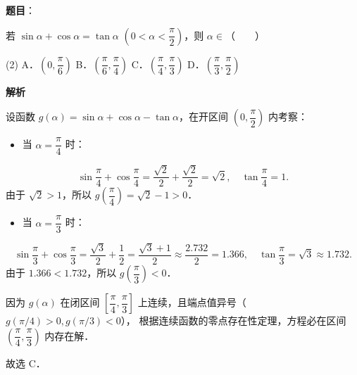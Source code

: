 \begin{answer}

\textbf{题目}：

若 $\sin\alpha + \cos\alpha = \tan\alpha$ $\left(0 < \alpha < \dfrac{\pi}{2}\right)$，则 $\alpha \in$\mbox{（　　）}

\begin{gkopts}(2)
\task A．$\left(0, \dfrac{\pi}{6}\right)$
\task B．$\left(\dfrac{\pi}{6}, \dfrac{\pi}{4}\right)$
\task C．$\left(\dfrac{\pi}{4}, \dfrac{\pi}{3}\right)$
\task D．$\left(\dfrac{\pi}{3}, \dfrac{\pi}{2}\right)$
\end{gkopts}

\textbf{解析}

设函数 $g(\alpha) = \sin\alpha + \cos\alpha - \tan\alpha$，在开区间 $\left(0, \dfrac{\pi}{2}\right)$ 内考察：
\begin{itemize}
\item 当 $\alpha = \dfrac{\pi}{4}$ 时：
\end{itemize}
\nopagebreak[4]
\[
\sin\frac{\pi}{4} + \cos\frac{\pi}{4} = \frac{\sqrt{2}}{2} + \frac{\sqrt{2}}{2} = \sqrt{2}, \quad \tan\frac{\pi}{4} = 1.
\]
  由于 $\sqrt{2} > 1$，所以 $g\left(\dfrac{\pi}{4}\right) = \sqrt{2} - 1 > 0$．
\begin{itemize}
\item 当 $\alpha = \dfrac{\pi}{3}$ 时：
\end{itemize}
\nopagebreak[4]
\[
\sin\frac{\pi}{3} + \cos\frac{\pi}{3} = \frac{\sqrt{3}}{2} + \frac{1}{2} = \frac{\sqrt{3} + 1}{2} \approx \frac{2.732}{2} = 1.366, \quad \tan\frac{\pi}{3} = \sqrt{3} \approx 1.732.
\]
  由于 $1.366 < 1.732$，所以 $g\left(\dfrac{\pi}{3}\right) < 0$．

因为 $g(\alpha)$ 在闭区间 $\left[\dfrac{\pi}{4}, \dfrac{\pi}{3}\right]$ 上连续，且端点值异号（$g(\pi/4) > 0, g(\pi/3) < 0$），
根据连续函数的零点存在性定理，方程必在区间 $\left(\dfrac{\pi}{4}, \dfrac{\pi}{3}\right)$ 内存在解．

故选 C．


\end{answer}

